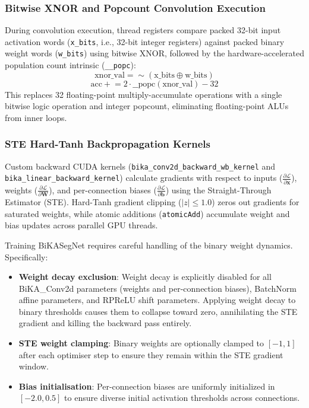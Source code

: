 \documentclass[a4paper]{report}
\begin{document}
\subsubsection{Bitwise XNOR and Popcount Convolution Execution}
During convolution execution, thread registers compare packed 32-bit input activation words (\texttt{x\_bits}, i.e., 32-bit integer registers) against packed binary weight words (\texttt{w\_bits}) using bitwise XNOR, followed by the hardware-accelerated population count intrinsic (\texttt{\_\_popc}):
\begin{equation}
    \text{xnor\_val} = \sim(\text{x\_bits} \oplus \text{w\_bits})
\end{equation}
\begin{equation}
    \text{acc} \mathrel{+}= 2 \cdot \text{\_\_popc}(\text{xnor\_val}) - 32
\end{equation}
This replaces 32 floating-point multiply-accumulate operations with a single bitwise logic operation and integer popcount, eliminating floating-point ALUs from inner loops.

\subsubsection{STE Hard-Tanh Backpropagation Kernels}
Custom backward CUDA kernels (\texttt{bika\_conv2d\_backward\_wb\_kernel} and \texttt{bika\_linear\_backward\_kernel}) calculate gradients with respect to inputs ($\frac{\partial \mathcal{L}}{\partial \mathbf{x}}$), weights ($\frac{\partial \mathcal{L}}{\partial \mathbf{W}}$), and per-connection biases ($\frac{\partial \mathcal{L}}{\partial \mathbf{b}}$) using the Straight-Through Estimator (STE). Hard-Tanh gradient clipping ($|z| \le 1.0$) zeros out gradients for saturated weights, while atomic additions (\texttt{atomicAdd}) accumulate weight and bias updates across parallel GPU threads.

Training BiKASegNet requires careful handling of the binary weight dynamics. Specifically:
\begin{itemize}
    \item \textbf{Weight decay exclusion}: Weight decay is explicitly disabled for all BiKA\_Conv2d parameters (weights and per-connection biases), BatchNorm affine parameters, and RPReLU shift parameters. Applying weight decay to binary thresholds causes them to collapse toward zero, annihilating the STE gradient and killing the backward pass entirely.
    \item \textbf{STE weight clamping}: Binary weights are optionally clamped to $[-1, 1]$ after each optimiser step to ensure they remain within the STE gradient window.
    \item \textbf{Bias initialisation}: Per-connection biases are uniformly initialized in $[-2.0, 0.5]$ to ensure diverse initial activation thresholds across connections.
\end{itemize}
\end{document}
